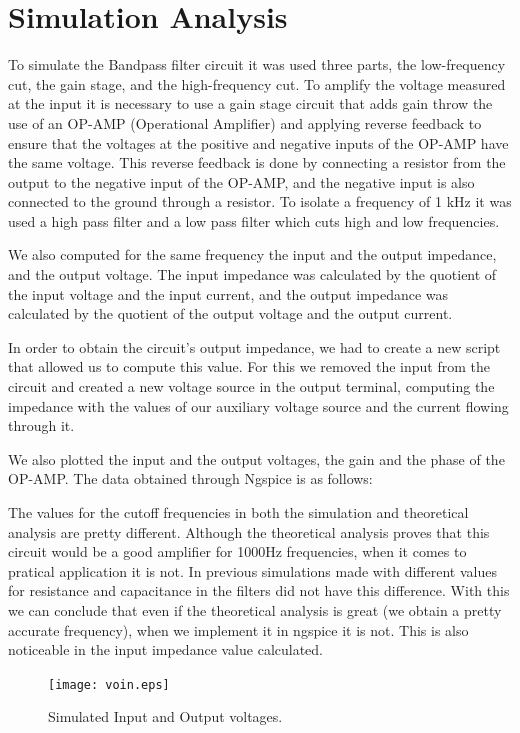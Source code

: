 \section{Simulation Analysis}
\label{sec:simulation}
To simulate the Bandpass filter circuit it was used three parts, the low-frequency cut, the gain stage, and the high-frequency cut.
To amplify the voltage measured at the input it is necessary to use a gain stage circuit that adds gain throw the use of an OP-AMP (Operational Amplifier) and applying reverse feedback to ensure that the voltages at the positive and negative inputs of the OP-AMP have the same voltage. This reverse feedback is done by connecting a resistor from the output to the negative input of the OP-AMP, and the negative input is also connected to the ground through a resistor.
To isolate a frequency of 1 kHz it was used a high pass filter and a low pass filter which cuts high and low frequencies.

We also computed for the same frequency the input and the output impedance, and the output voltage. The input impedance was calculated by the quotient of the input voltage and the input current, and the output impedance was calculated by the quotient of the output voltage and the output current.

In order to obtain the circuit's output impedance, we had to create a new script that allowed us to compute this value. For this we removed the input from the circuit and created a new voltage source in the output terminal, computing the impedance with the values of our auxiliary voltage source and the current flowing through it.

We also plotted the input and the output voltages, the gain and the phase of the OP-AMP.
The data obtained through Ngspice is as follows:

The values for the cutoff frequencies in both the simulation and theoretical analysis are pretty different. Although the theoretical analysis proves that this circuit would be a good amplifier for 1000Hz frequencies, when it comes to pratical application it is not. In previous simulations made with different values for resistance and capacitance in the filters did not have this difference. With this we can conclude that even if the theoretical analysis is great (we obtain a pretty accurate frequency), when we implement it in ngspice it is not. This is also noticeable in the input impedance value calculated.

\begin{figure}[h] 
\centering
\texttt{[image: voin.eps]}
\caption{Simulated Input and Output voltages.}
\label{Fig3: InOutvoltage}
\end{figure}


